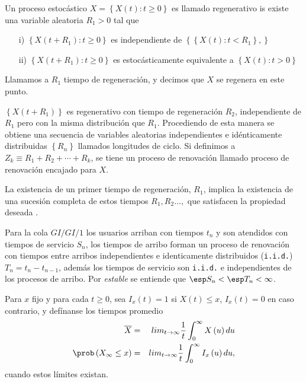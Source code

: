 \begin{Def}
Un proceso estoc\'astico $X=\left\{X\left(t\right):t\geq0\right\}$ es llamado regenerativo is existe una variable aleatoria $R_{1}>0$ tal que
\begin{itemize}
\item[i)] $\left\{X\left(t+R_{1}\right):t\geq0\right\}$ es independiente de $\left\{\left\{X\left(t\right):t<R_{1}\right\},\right\}$
\item[ii)] $\left\{X\left(t+R_{1}\right):t\geq0\right\}$ es estoc\'asticamente equivalente a $\left\{X\left(t\right):t>0\right\}$
\end{itemize}

Llamamos a $R_{1}$ tiempo de regeneraci\'on, y decimos que $X$ se regenera en este punto.
\end{Def}

$\left\{X\left(t+R_{1}\right)\right\}$ es regenerativo con tiempo de regeneraci\'on $R_{2}$, independiente de $R_{1}$ pero con la misma distribuci\'on que $R_{1}$. Procediendo de esta manera se obtiene una secuencia de variables aleatorias independientes e id\'enticamente distribuidas $\left\{R_{n}\right\}$ llamados longitudes de ciclo. Si definimos a $Z_{k}\equiv R_{1}+R_{2}+\cdots+R_{k}$, se tiene un proceso de renovaci\'on llamado proceso de renovaci\'on encajado para $X$.


\begin{Note}
La existencia de un primer tiempo de regeneraci\'on, $R_{1}$, implica la existencia de una sucesi\'on completa de estos tiempos $R_{1},R_{2}\ldots,$ que satisfacen la propiedad deseada \cite{Sigman2}.
\end{Note}


\begin{Note} Para la cola $GI/GI/1$ los usuarios arriban con tiempos $t_{n}$ y son atendidos con tiempos de servicio $S_{n}$, los tiempos de arribo forman un proceso de renovaci\'on  con tiempos entre arribos independientes e identicamente distribuidos (\texttt{i.i.d.})$T_{n}=t_{n}-t_{n-1}$, adem\'as los tiempos de servicio son \texttt{i.i.d.} e independientes de los procesos de arribo. Por \textit{estable} se entiende que $\esp S_{n}<\esp T_{n}<\infty$.
\end{Note}
 


\begin{Def}
Para $x$ fijo y para cada $t\geq0$, sea $I_{x}\left(t\right)=1$ si $X\left(t\right)\leq x$,  $I_{x}\left(t\right)=0$ en caso contrario, y def\'inanse los tiempos promedio
\begin{eqnarray*}
\overline{X}&=&lim_{t\rightarrow\infty}\frac{1}{t}\int_{0}^{\infty}X\left(u\right)du\\
\prob\left(X_{\infty}\leq x\right)&=&lim_{t\rightarrow\infty}\frac{1}{t}\int_{0}^{\infty}I_{x}\left(u\right)du,
\end{eqnarray*}
cuando estos l\'imites existan.
\end{Def}

